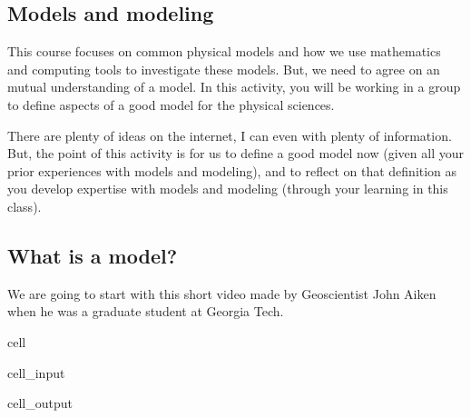 \documentclass[letterpaper,10pt,english]{jupyterBook}
\begin{document}
\subsection{Models and modeling}
\label{\detokenize{content/1_modeling/activity-what_is_a_model:models-and-modeling}}
\sphinxAtStartPar
This course focuses on common physical models and how we use mathematics and computing tools to investigate these models. But, we need to agree on an mutual understanding of a model. In this activity, you will be working in a group to define aspects of a good model for the physical sciences.

\sphinxAtStartPar
There are plenty of ideas on the internet, I can even  with plenty of information. But, the point of this activity is for us to define a good model now (given all your prior experiences with models and modeling), and to reflect on that definition as you develop expertise with models and modeling (through your learning in this class).


\subsection{What is a model?}
\label{\detokenize{content/1_modeling/activity-what_is_a_model:what-is-a-model}}
\sphinxAtStartPar
We are going to start with this short video made by Geoscientist John Aiken when he was a graduate student at Georgia Tech.

\begin{sphinxuseclass}{cell}\begin{sphinxVerbatimInput}

\begin{sphinxuseclass}{cell_input}
\begin{sphinxVerbatim}[commandchars=\\\{\}]
   
      
\end{sphinxVerbatim}

\end{sphinxuseclass}\end{sphinxVerbatimInput}
\begin{sphinxVerbatimOutput}

\begin{sphinxuseclass}{cell_output}
\noindent{}

\end{sphinxuseclass}\end{sphinxVerbatimOutput}

\end{sphinxuseclass}
\end{document}

